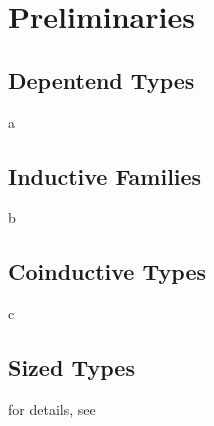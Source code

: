 \chapter{Preliminaries}

\section{Depentend Types}
a
\section{Inductive Families}
b
\section{Coinductive Types}
c
\section{Sized Types}
for details, see \cite{abel:PhD}
